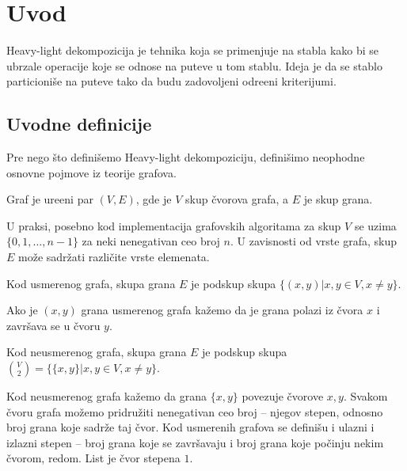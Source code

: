 \section{Uvod}

Heavy-light dekompozicija je tehnika koja se primenjuje na stabla kako bi se ubrzale operacije koje se odnose na puteve u tom stablu. Ideja je da se stablo particioni\v se na puteve tako da budu zadovoljeni odre\dj eni kriterijumi.

\subsection{Uvodne definicije}


Pre nego \v sto defini\v semo Heavy-light dekompoziciju, defini\v simo neophodne osnovne pojmove iz teorije grafova.

\begin{dfn}
Graf je ure\dj eni par $(V,E)$, gde je $V$ skup \v cvorova grafa, a $E$ je skup grana.
\end{dfn}

U praksi, posebno kod implementacija grafovskih algoritama za skup $V$ se uzima $\{0, 1, \ldots, n-1\}$ za neki nenegativan ceo broj $n$. U zavisnosti od vrste grafa, skup $E$ mo\v ze sadr\v zati razli\v cite vrste elemenata.

\begin{dfn}
Kod usmerenog grafa, skupa grana $E$ je podskup skupa \newline $\{(x,y) | x,y \in V, x\not = y\}$.
\end{dfn}

Ako je $(x,y)$ grana usmerenog grafa ka\v zemo da je grana polazi iz \v cvora $x$ i zavr\v sava se u \v cvoru $y$.

\begin{dfn}
Kod neusmerenog grafa, skupa grana $E$ je podskup skupa $\binom V2 = \{\{x,y\} | x,y \in V, x \not = y\}$.
\end{dfn}

Kod neusmerenog grafa ka\v zemo da grana $\{x,y\}$ povezuje \v cvorove $x,y$. Svakom \v cvoru grafa mo\v zemo pridru\v ziti nenegativan ceo broj -- njegov stepen, odnosno broj grana koje sadr\v ze taj \v cvor. Kod usmerenih grafova se defini\v su i ulazni i izlazni stepen -- broj grana koje se zavr\v savaju i broj grana koje po\v cinju nekim \v cvorom, redom. List je \v cvor stepena $1$.


